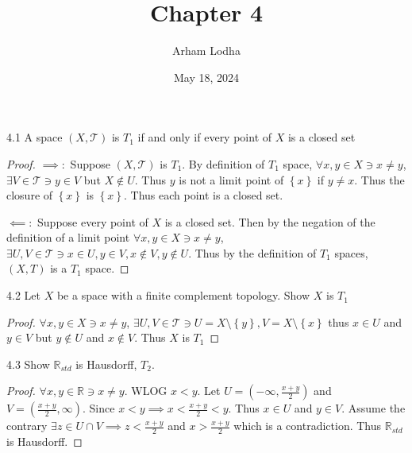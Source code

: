 \documentclass{article}
\newcommand*{\T}{\mathcal{T}}
\newcommand{\R}{\mathbb{R}}
\begin{document}
\title{Chapter 4}
\author{Arham Lodha}%
\date{May 18, 2024}%
\maketitle

\begin{claim}{4.1}\label{Claim 4.1.}
    A space $(X, \T)$ is $T_1$ if and only if every point of $X$ is a closed set   
\end{claim}
\begin{proof}
    $\implies:$ Suppose $(X, \T)$ is $T_1$. By definition of $T_1$ space, $\forall x, y \in X \ni x \neq y$, $\exists V \in \T \ni y \in V$ but $X \not \in U$. Thus $y$ is not a limit point of $\left\{ x \right\}$ if $y \neq x$. Thus the closure of $\left\{ x \right\}$ is $\left\{ x \right\}$. Thus each point is a closed set. 
    
    $\impliedby:$ Suppose every point of $X$ is a closed set. Then by the negation of the definition of a limit point $\forall x, y \in X \ni x \neq y$, $\exists U, V \in \T \ni x \in U, y \in V, x \not \in V, y \not \in U$. Thus by the definition of $T_1$ spaces, $(X, T)$ is a $T_1$ space.      
\end{proof}

\bigskip

\begin{PROB}{4.2}\label{Problem 4.2.}
    Let $X$ be a space with a finite complement topology. Show $X$ is $T_1$   
\end{PROB}
\begin{proof}
    $\forall x, y \in X \ni x \neq y$, $\exists U, V \in \T \ni U = X \setminus \left\{ y \right\}, V = X \setminus \left\{ x \right\}$ thus $x \in U$ and $y \in V$ but $y \not \in U$ and $x \not \in V$. Thus $X$ is $T_1$        
\end{proof}

\bigskip

\begin{PROB}{4.3}\label{Problem 4.3.}
    Show $\R_{s td}$ is Hausdorff, $T_2$.  
\end{PROB}
\begin{proof}
    $\forall x, y \in \R \ni x \neq y$. WLOG $x < y$. Let $U = (-\infty, \frac{x+ y}{2})$ and $V = (\frac{x + y}{2}, \infty)$. Since $x < y \implies x < \frac{x+ y}{2} < y$. Thus $x \in U$ and $y \in V$. Assume the contrary $\exists z \in U \cap V \implies z < \frac{x + y}{2}$ and $x > \frac{x + y}{2}$ which is a contradiction. Thus $\R_{st d}$ is Hausdorff.         
\end{proof}
\end{document}
